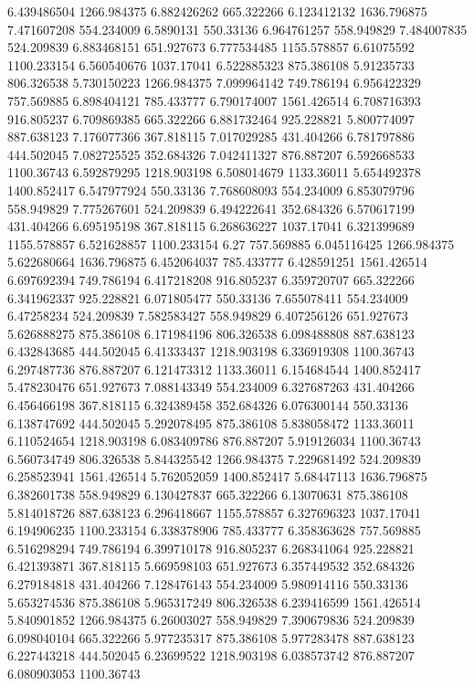 6.439486504	1266.984375
6.882426262	665.322266
6.123412132	1636.796875
7.471607208	554.234009
6.5890131	550.33136
6.964761257	558.949829
7.484007835	524.209839
6.883468151	651.927673
6.777534485	1155.578857
6.61075592	1100.233154
6.560540676	1037.17041
6.522885323	875.386108
5.91235733	806.326538
5.730150223	1266.984375
7.099964142	749.786194
6.956422329	757.569885
6.898404121	785.433777
6.790174007	1561.426514
6.708716393	916.805237
6.709869385	665.322266
6.881732464	925.228821
5.800774097	887.638123
7.176077366	367.818115
7.017029285	431.404266
6.781797886	444.502045
7.082725525	352.684326
7.042411327	876.887207
6.592668533	1100.36743
6.592879295	1218.903198
6.508014679	1133.36011
5.654492378	1400.852417
6.547977924	550.33136
7.768608093	554.234009
6.853079796	558.949829
7.775267601	524.209839
6.494222641	352.684326
6.570617199	431.404266
6.695195198	367.818115
6.268636227	1037.17041
6.321399689	1155.578857
6.521628857	1100.233154
6.27	757.569885
6.045116425	1266.984375
5.622680664	1636.796875
6.452064037	785.433777
6.428591251	1561.426514
6.697692394	749.786194
6.417218208	916.805237
6.359720707	665.322266
6.341962337	925.228821
6.071805477	550.33136
7.655078411	554.234009
6.47258234	524.209839
7.582583427	558.949829
6.407256126	651.927673
5.626888275	875.386108
6.171984196	806.326538
6.098488808	887.638123
6.432843685	444.502045
6.41333437	1218.903198
6.336919308	1100.36743
6.297487736	876.887207
6.121473312	1133.36011
6.154684544	1400.852417
5.478230476	651.927673
7.088143349	554.234009
6.327687263	431.404266
6.456466198	367.818115
6.324389458	352.684326
6.076300144	550.33136
6.138747692	444.502045
5.292078495	875.386108
5.838058472	1133.36011
6.110524654	1218.903198
6.083409786	876.887207
5.919126034	1100.36743
6.560734749	806.326538
5.844325542	1266.984375
7.229681492	524.209839
6.258523941	1561.426514
5.762052059	1400.852417
5.68447113	1636.796875
6.382601738	558.949829
6.130427837	665.322266
6.13070631	875.386108
5.814018726	887.638123
6.296418667	1155.578857
6.327696323	1037.17041
6.194906235	1100.233154
6.338378906	785.433777
6.358363628	757.569885
6.516298294	749.786194
6.399710178	916.805237
6.268341064	925.228821
6.421393871	367.818115
5.669598103	651.927673
6.357449532	352.684326
6.279184818	431.404266
7.128476143	554.234009
5.980914116	550.33136
5.653274536	875.386108
5.965317249	806.326538
6.239416599	1561.426514
5.840901852	1266.984375
6.26003027	558.949829
7.390679836	524.209839
6.098040104	665.322266
5.977235317	875.386108
5.977283478	887.638123
6.227443218	444.502045
6.23699522	1218.903198
6.038573742	876.887207
6.080903053	1100.36743
